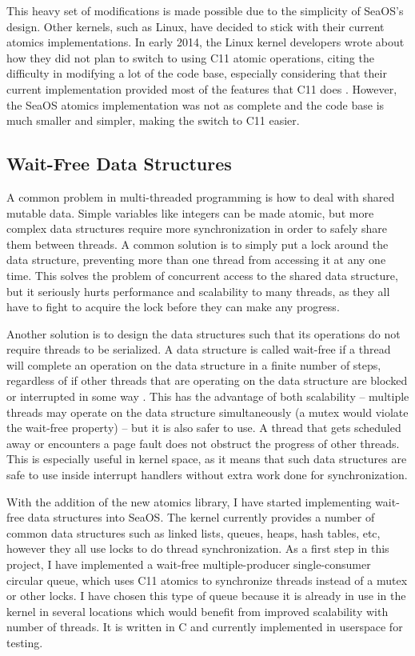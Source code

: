 \documentclass[12pt]{article}
\begin{document}
This heavy set of modifications is made possible due to the simplicity of SeaOS's design. Other kernels, such
as Linux, have decided to stick with their current atomics implementations. In early
2014, the Linux kernel developers wrote about how they did not plan to switch to
using C11 atomic operations, citing the difficulty in modifying a lot of the code
base, especially considering that their current implementation provided most of the
features that C11 does \cite{linux-no-c11}. However, the SeaOS atomics implementation was not as complete
and the code base is much smaller and simpler, making the switch to C11 easier.

\subsection{Wait-Free Data Structures}

A common problem in multi-threaded programming is how to deal with shared mutable
data. Simple variables like integers can be made atomic, but more complex data
structures require more synchronization in order to safely share them between
threads. A common solution is to simply put a lock around the data structure,
preventing more than one thread from accessing it at any one time. This solves
the problem of concurrent access to the shared data structure, but it seriously
hurts performance and scalability to many threads, as they all have to fight
to acquire the lock before they can make any progress.


Another solution is to design the data structures such that its operations
do not require threads to be serialized. A data structure is called wait-free
if a thread will complete an operation on the data structure in a finite number
of steps, regardless of if other threads that are operating on the data structure
are blocked or interrupted in some way \cite{herlihy1991wait}. This has the advantage of both
scalability -- multiple threads may operate on the data structure simultaneously (a
mutex would violate the wait-free property) -- but it is also safer to use. A
thread that gets scheduled away or encounters a page fault does not obstruct
the progress of other threads. This is especially useful in kernel space, as it
means that such data structures are safe to use inside interrupt handlers without extra
work done for synchronization.

With the addition of the new atomics library, I have started implementing
wait-free data structures into SeaOS. The kernel currently provides a number of common
data structures such as linked lists, queues, heaps, hash tables, etc, however they all use
locks to do thread synchronization. As a first step in this project, I have implemented a
wait-free multiple-producer single-consumer circular queue, which uses C11 atomics to
synchronize threads instead of a mutex or other locks. I have chosen this type of queue
because it is already in use in the kernel in several locations which would benefit from
improved scalability with number of threads. It is written in C and currently implemented
in userspace for testing.
\end{document}
